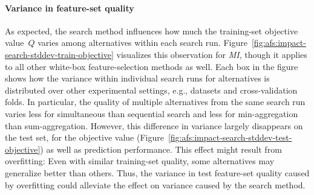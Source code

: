 \documentclass[iicol, sn-basic, Numbered]{sn-jnl} %
\theoremstyle{plain}
\theoremstyle{definition}
\begin{document}
\paragraph{Variance in feature-set quality}

As expected, the search method influences how much the training-set objective value~$Q$ varies among alternatives within each search run.
Figure~\ref{fig:afs:impact-search-stddev-train-objective} visualizes this observation for \emph{MI}, though it applies to all other white-box feature-selection methods as well.
Each box in the figure shows how the variance within individual search runs for alternatives is distributed over other experimental settings, e.g., datasets and cross-validation folds.
In particular, the quality of multiple alternatives from the same search run varies less for simultaneous than sequential search and less for min-aggregation than sum-aggregation.
However, this difference in variance largely disappears on the test set, for the objective value (Figure~\ref{fig:afs:impact-search-stddev-test-objective}) as well as prediction performance.
This effect might result from overfitting:
Even with similar training-set quality, some alternatives may generalize better than others.
Thus, the variance in test feature-set quality caused by overfitting could alleviate the effect on variance caused by the search method.
\end{document}

